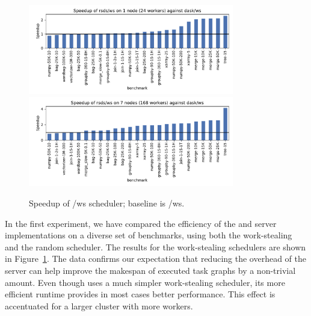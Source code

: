 \begin{figure}
	\centering
	\includegraphics[width=0.8\textwidth]{./imgs/rsds/charts/speedup-rsds-ws-1}
	\includegraphics[width=0.8\textwidth]{./imgs/rsds/charts/speedup-rsds-ws-7}
	\caption{Speedup of \rsds{}/ws scheduler; baseline is \dask{}/ws.}
	\label{fig:rsds-dask-ws-all}
\end{figure}

In the first experiment, we have compared the efficiency of the \rsds{} and
\dask{} server implementations on a diverse set of benchmarks, using both the
work-stealing and the random scheduler. The results for the work-stealing schedulers are shown in
Figure~\ref{fig:rsds-dask-ws-all}. The data confirms our expectation that reducing the overhead of
the server can help improve the makespan of executed task graphs by a non-trivial amount. Even
though \rsds{} uses a much simpler work-stealing scheduler, its more efficient
runtime provides in most cases better performance. This effect is accentuated for a larger cluster
with more workers.


